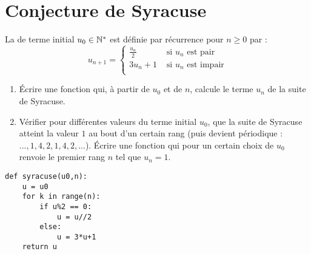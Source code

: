 \section{Conjecture de Syracuse}

\begin{frame}
\begin{tp}
La  de terme initial $u_0 \in \mathbb{N}^*$ est définie par récurrence
pour $n\ge0$ par :
$$u_{n+1} = 
\begin{cases}
  \frac{u_n}{2} & \text{ si $u_n$ est pair} \\
  3u_n + 1 & \text{ si $u_n$ est impair} \\
  \end{cases}$$
\begin{enumerate}
  \item \'Ecrire une fonction qui, à partir de $u_0$ et de $n$, calcule le terme $u_n$ de la suite de Syracuse.
  \item Vérifier pour différentes valeurs du terme initial $u_0$, que la suite de Syracuse
  atteint la valeur $1$ au bout d'un certain rang (puis devient périodique : 
  $...,1,4,2,1,4,2,...$). \'Ecrire une fonction qui pour un certain choix de $u_0$ 
  renvoie le premier rang $n$ tel que $u_n=1$.
\end{enumerate}

\end{tp}

\end{frame}


\begin{frame}[fragile]

\begin{algo}
\begin{lstlisting}
def syracuse(u0,n):
    u = u0
    for k in range(n):
        if u%2 == 0:
            u = u//2
        else:
            u = 3*u+1
    return u
\end{lstlisting}
\end{algo}
\end{frame}



